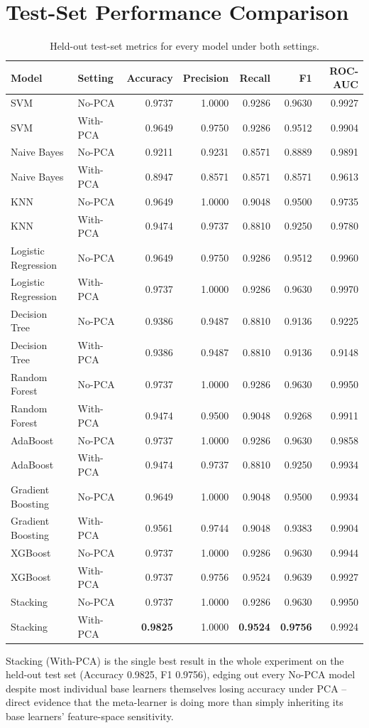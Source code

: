 \documentclass[11pt,a4paper]{article}
\begin{document}
\section{Test-Set Performance Comparison}
\begin{table}[h]
\centering
\small
\begin{tabular}{@{}llrrrrr@{}}
\toprule
Model & Setting & Accuracy & Precision & Recall & F1 & ROC-AUC \\
\midrule
SVM & No-PCA & 0.9737 & 1.0000 & 0.9286 & 0.9630 & 0.9927 \\
SVM & With-PCA & 0.9649 & 0.9750 & 0.9286 & 0.9512 & 0.9904 \\
Naive Bayes & No-PCA & 0.9211 & 0.9231 & 0.8571 & 0.8889 & 0.9891 \\
Naive Bayes & With-PCA & 0.8947 & 0.8571 & 0.8571 & 0.8571 & 0.9613 \\
KNN & No-PCA & 0.9649 & 1.0000 & 0.9048 & 0.9500 & 0.9735 \\
KNN & With-PCA & 0.9474 & 0.9737 & 0.8810 & 0.9250 & 0.9780 \\
Logistic Regression & No-PCA & 0.9649 & 0.9750 & 0.9286 & 0.9512 & 0.9960 \\
Logistic Regression & With-PCA & 0.9737 & 1.0000 & 0.9286 & 0.9630 & 0.9970 \\
Decision Tree & No-PCA & 0.9386 & 0.9487 & 0.8810 & 0.9136 & 0.9225 \\
Decision Tree & With-PCA & 0.9386 & 0.9487 & 0.8810 & 0.9136 & 0.9148 \\
Random Forest & No-PCA & 0.9737 & 1.0000 & 0.9286 & 0.9630 & 0.9950 \\
Random Forest & With-PCA & 0.9474 & 0.9500 & 0.9048 & 0.9268 & 0.9911 \\
AdaBoost & No-PCA & 0.9737 & 1.0000 & 0.9286 & 0.9630 & 0.9858 \\
AdaBoost & With-PCA & 0.9474 & 0.9737 & 0.8810 & 0.9250 & 0.9934 \\
Gradient Boosting & No-PCA & 0.9649 & 1.0000 & 0.9048 & 0.9500 & 0.9934 \\
Gradient Boosting & With-PCA & 0.9561 & 0.9744 & 0.9048 & 0.9383 & 0.9904 \\
XGBoost & No-PCA & 0.9737 & 1.0000 & 0.9286 & 0.9630 & 0.9944 \\
XGBoost & With-PCA & 0.9737 & 0.9756 & 0.9524 & 0.9639 & 0.9927 \\
Stacking & No-PCA & 0.9737 & 1.0000 & 0.9286 & 0.9630 & 0.9950 \\
Stacking & With-PCA & \textbf{0.9825} & 1.0000 & \textbf{0.9524} & \textbf{0.9756} & 0.9924 \\
\bottomrule
\end{tabular}
\caption{Held-out test-set metrics for every model under both settings.}
\end{table}
Stacking (With-PCA) is the single best result in the whole experiment on the held-out test set (Accuracy 0.9825, F1 0.9756), edging out every No-PCA model despite most individual base learners themselves losing accuracy under PCA -- direct evidence that the meta-learner is doing more than simply inheriting its base learners' feature-space sensitivity.
\end{document}
